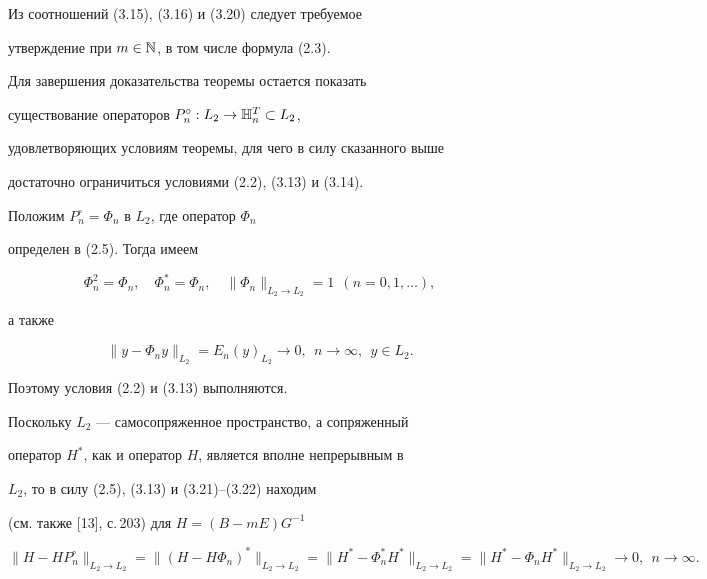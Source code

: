 Из соотношений (3.15), (3.16) и (3.20) следует требуемое


утверждение при $m\in\Bbb {N}$, в том числе формула (2.3).





Для завершения доказательства теоремы остается показать


существование операторов $P_n^\circ:L_2\to \Bbb {H}_n^T\subset L_2$,


удовлетворяющих условиям теоремы, для чего в силу сказанного выше


достаточно ограничиться условиями (2.2), (3.13) и (3.14).





Положим $P_n^\circ = \Phi_n$ в $L_2$, где оператор $\Phi_n$


определен в (2.5). Тогда имеем


\begin{equation}


\Phi_n^2 = \Phi_n,\quad \Phi_n^* = \Phi_n,\quad \|\Phi_n\|_{L_2\to


L_2}=1\ \ (n=0,1,\dotsc),


\end{equation}


а также


\begin{equation}


\|y - \Phi_n y\|_{L_2} = E_n(y)_{L_2}\to 0,\ \ n\to \infty,\ \ y\in


L_2.


\end{equation}


Поэтому условия (2.2) и (3.13) выполняются.


Поскольку $L_2$ --- самосопряженное пространство, а сопряженный


оператор $H^*$, как и оператор $H$, является вполне непрерывным в


$L_2$, то в силу (2.5), (3.13) и (3.21)--(3.22) находим


(см. также [13], с.\,203) для $H =(B-mE)G^{-1}$


$$


\|H - HP_n^\circ\|_{L_2\to L_2} = \|(H-H\Phi_n)^*\|_{L_2\to L_2} =


\|H^* - \Phi_n^*H^*\|_{L_2\to L_2} =


\|H^* - \Phi_nH^*\|_{L_2\to L_2}\to 0,\ \ n\to \infty.


$$





